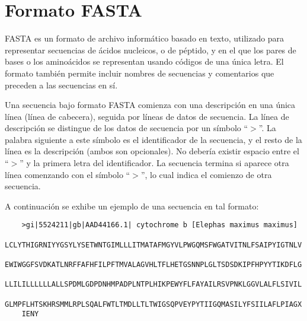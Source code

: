 \chapter{Formato FASTA}
\label{fasta}

\par \textsc{FASTA} es un formato de archivo informático basado en texto, utilizado para representar secuencias de ácidos nucleicos, o de péptido, y en el que los pares de bases o los aminoácidos se representan usando códigos de una única letra. El formato también permite incluir nombres de secuencias y comentarios que preceden a las secuencias en sí.	

\par Una secuencia bajo formato \textsc{FASTA} comienza con una descripción en una única línea (línea de cabecera), seguida por líneas de datos de secuencia. La línea de descripción se distingue de los datos de secuencia por un símbolo ``$>$''. La palabra siguiente a este símbolo es el identificador de la secuencia, y el resto de la línea es la descripción (ambos son opcionales). No debería existir espacio entre el ``$>$'' y la primera letra del identificador. La secuencia termina si aparece otra línea comenzando con el símbolo ``$>$'', lo cual indica el comienzo de otra secuencia. 
	
\par A continuación se exhibe un ejemplo de una secuencia en tal formato:	
\begin{verbatim}
	>gi|5524211|gb|AAD44166.1| cytochrome b [Elephas maximus maximus]
	LCLYTHIGRNIYYGSYLYSETWNTGIMLLLITMATAFMGYVLPWGQMSFWGATVITNLFSAIPYIGTNLV
	EWIWGGFSVDKATLNRFFAFHFILPFTMVALAGVHLTFLHETGSNNPLGLTSDSDKIPFHPYYTIKDFLG
	LLILILLLLLLALLSPDMLGDPDNHMPADPLNTPLHIKPEWYFLFAYAILRSVPNKLGGVLALFLSIVIL
	GLMPFLHTSKHRSMMLRPLSQALFWTLTMDLLTLTWIGSQPVEYPYTIIGQMASILYFSIILAFLPIAGX
	IENY
\end{verbatim}

